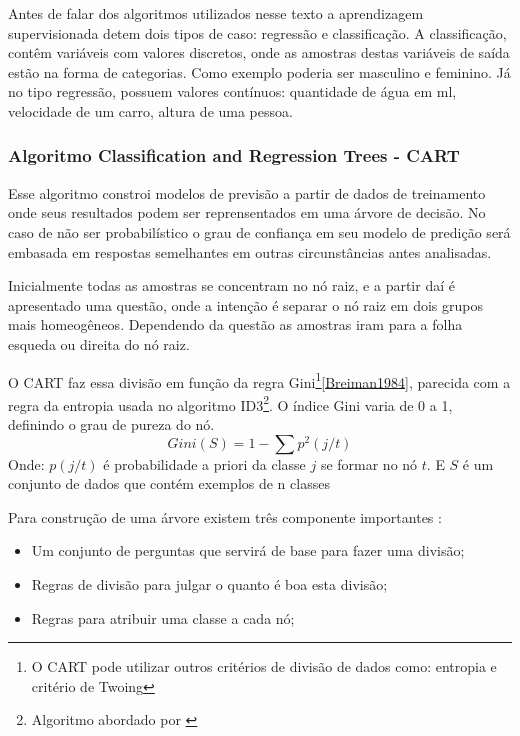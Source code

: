 Antes de falar dos algoritmos utilizados nesse texto a aprendizagem supervisionada detem dois tipos de caso: regressão e classificação. A classificação, contêm variáveis com valores discretos, onde as amostras destas variáveis de saída estão na forma de categorias. Como exemplo poderia ser masculino e feminino. Já no tipo regressão, possuem valores contínuos: quantidade de água em ml, velocidade de um carro, altura de uma pessoa.


\subsubsection{Algoritmo Classification and Regression Trees  - CART}\label{sssec:cart}
Esse algoritmo constroi modelos de previsão a partir de dados de treinamento onde seus resultados podem ser reprensentados em uma árvore de decisão. No caso de não ser probabilístico o grau de confiança em seu modelo de predição será embasada em respostas semelhantes em outras circunstâncias antes analisadas. 

Inicialmente todas as amostras se concentram no nó raiz, e a partir daí é apresentado uma questão, onde a intenção é separar o nó raiz em dois grupos mais homeogêneos. Dependendo da questão as amostras iram para a folha esqueda ou direita do nó raiz.

O CART faz essa divisão em função da regra Gini\footnote{O CART pode utilizar outros critérios de divisão de dados como: entropia e critério de Twoing}\ref{Breiman1984}, parecida com a regra da entropia usada no algoritmo ID3\footnote{Algoritmo abordado por \cite{quinlans}}. O índice Gini varia de 0 a 1, definindo o grau de pureza do nó. 
\begin{equation}
Gini(S)= 1 - \sum p^2(j/t)
 \label{eq:cartGini}
\end{equation}
Onde: ${p(j/t)}$ é probabilidade a priori da classe ${j}$ se formar no nó ${t}$. E ${S}$ é um conjunto de dados que contém exemplos de n classes

Para construção de uma árvore existem três componente importantes \cite{yohannes1999classification}: 
\begin{itemize}
[noitemsep]
 \item Um conjunto de perguntas que servirá de base para fazer uma divisão;
 \item Regras de divisão para julgar o quanto é boa esta divisão;
 \item Regras para atribuir uma classe a cada nó;
\end{itemize}

